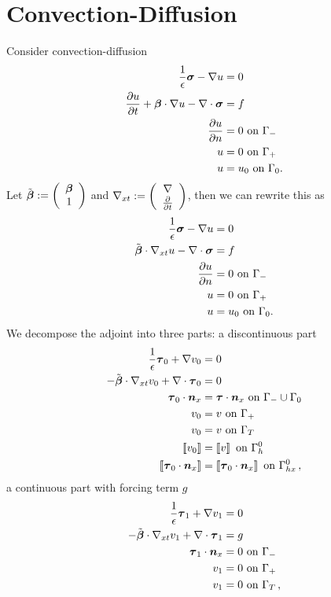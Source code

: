 \documentclass{article}
\begin{document}
\section{Convection-Diffusion}

Consider convection-diffusion
\begin{align*}
\frac{1}{\epsilon}\boldsymbol\sigma-\nabla u &=0\\
\frac{\partial u}{\partial t} + \boldsymbol\beta\cdot\nabla u - \nabla\cdot\boldsymbol\sigma &= f\\
\frac{\partial u}{\partial n} &= 0 \text{ on } \Gamma_-\\
u &= 0 \text{ on } \Gamma_+\\
u &= u_0 \text{ on } \Gamma_0.
\end{align*}
Let $\tilde{\boldsymbol\beta}:=\left( \begin{array}{c} \boldsymbol\beta\\ 1\\ \end{array} \right)$ and $\nabla_{xt}:=\left( \begin{array}{c} \nabla\\ \frac{\partial}{\partial t}\\ \end{array} \right)$, then we can rewrite this as
\begin{align*}
\frac{1}{\epsilon}\boldsymbol\sigma-\nabla u &=0\\
\tilde{\boldsymbol\beta}\cdot\nabla_{xt} u - \nabla\cdot\boldsymbol\sigma &= f\\
\frac{\partial u}{\partial n} &= 0 \text{ on } \Gamma_-\\
u &= 0 \text{ on } \Gamma_+\\
u &= u_0 \text{ on } \Gamma_0.
\end{align*}
We decompose the adjoint into three parts:
a discontinuous part
\begin{align*}
\frac{1}{\epsilon}\bftau_0+\Grad v_0 &=0\\
-\tilde\bfbeta\cdot\Gradxt v_0 + \Div\bftau_0 &= 0\\
\bftau_0\cdot\bfn_x &= \bftau\cdot\bfn_x \text{ on } \Gamma_-\cup\Gamma_0\\
v_0 &= v \text{ on } \Gamma_+\\
v_0 &= v \text{ on } \Gamma_T\\
\jump{v_0}&=\jump{v} \text{ on } \Gamma_h^0\\
\jump{\bftau_0\cdot\bfn_x}&=\jump{\bftau_0\cdot\bfn_x} \text{ on } \Gamma_{hx}^0\,,
\end{align*}
a continuous part with forcing term $g$
\begin{align*}
\frac{1}{\epsilon}\boldsymbol\tau_1+\nabla v_1 &=0\\
-\tilde{\boldsymbol\beta}\cdot\nabla_{xt} v_1 + \nabla\cdot\boldsymbol\tau_1 &= g\\
\boldsymbol\tau_1\cdot\boldsymbol n_x &= 0 \text{ on } \Gamma_-\\
v_1 &= 0 \text{ on } \Gamma_+\\
v_1 &= 0 \text{ on } \Gamma_T\,,
\end{align*}
\end{document}
